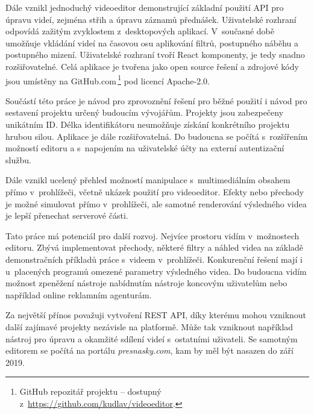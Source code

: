 Dále vznikl jednoduchý videoeditor demonstrující základní použití API pro úpravu videí, zejména střih a úpravu záznamů přednášek. Uživatelské rozhraní odpovídá zažitým zvyklostem z~desktopových aplikací. V~současné době umožňuje vkládání videí na časovou osu aplikování filtrů, postupného náběhu a postupného mizení. Uživatelské rozhraní tvoří React komponenty, je tedy snadno rozšiřovatelné. Celá aplikace je tvořena jako open source řešení a zdrojové kódy jsou umístěny na GitHub.com\,\footnote{GitHub repozitář projektu -- dostupný z~\url{https://github.com/kudlav/videoeditor}.} pod licencí Apache-2.0.

Součástí této práce je návod pro zprovoznění řešení pro běžné použití i návod pro sestavení projektu určený budoucím vývojářům. Projekty jsou zabezpečeny unikátním ID. Délka identifikátoru neumožňuje získání konkrétního projektu hrubou silou. Aplikace je dále rozšiřovatelná. Do budoucna se počítá s~rozšířením možností editoru a s~napojením na uživatelské účty na externí autentizační službu.

Dále vznikl ucelený přehled možností manipulace s~multimediálním obsahem přímo v~prohlížeči, včetně ukázek použití pro videoeditor. Efekty nebo přechody je možné simulovat přímo v~prohlížeči, ale samotné renderování výsledného videa je lepší přenechat serverové části.

Tato práce má potenciál pro další rozvoj. Nejvíce prostoru vidím v~možnostech editoru. Zbývá implementovat přechody, některé filtry a náhled videa na základě demonstračních příkladů práce s~videem v~prohlížeči. Konkurenční řešení mají i u~placených programů omezené parametry výsledného videa. Do budoucna vidím možnost zpeněžení nástroje nabídnutím nástroje koncovým uživatelům nebo například online reklamním agenturám.

Za největší přínos považuji vytvoření REST API, díky kterému mohou vzniknout další zajímavé projekty nezávisle na platformě. Může tak vzniknout například nástroj pro úpravu a okamžité sdílení videí s~ostatními uživateli. Se samotným editorem se počítá na portálu \textit{presnasky.com}, kam by měl být nasazen do září 2019.

